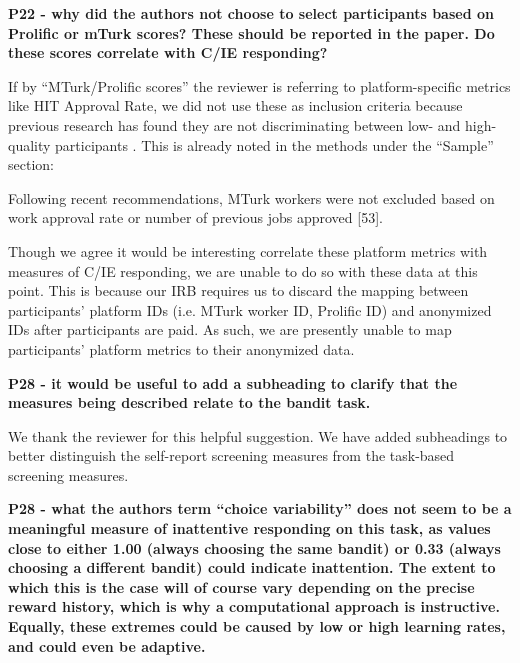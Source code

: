 \documentclass[a4paper,notitlepage,12pt]{article}
\begin{document}
\textbf{P22 - why did the authors not choose to select participants based on Prolific or mTurk scores? These should be reported in the paper. Do these scores correlate with C/IE responding?}

If by ``MTurk/Prolific scores'' the reviewer is referring to platform-specific metrics like HIT Approval Rate, we did not use these as inclusion criteria because previous research has found they are not discriminating between low- and high-quality participants \cite{robinson2019tapped}. This is already noted in the methods under the ``Sample'' section:

\begin{displayquote}
Following recent recommendations, MTurk workers were not excluded based on work approval rate or number of previous jobs approved [53].
\end{displayquote}

Though we agree it would be interesting correlate these platform metrics with measures of C/IE responding, we are unable to do so with these data at this point. This is because our IRB requires us to discard the mapping between participants' platform IDs (i.e. MTurk worker ID, Prolific ID) and anonymized IDs after participants are paid. As such, we are presently unable to map participants' platform metrics to their anonymized data.

\textbf{P28 - it would be useful to add a subheading to clarify that the measures being described relate to the bandit task.}

We thank the reviewer for this helpful suggestion. We have added subheadings to better distinguish the self-report screening measures from the task-based screening measures. 

\textbf{P28 - what the authors term ``choice variability'' does not seem to be a meaningful measure of inattentive responding on this task, as values close to either 1.00 (always choosing the same bandit) or 0.33 (always choosing a different bandit) could indicate inattention. The extent to which this is the case will of course vary depending on the precise reward history, which is why a computational approach is instructive. Equally, these extremes could be caused by low or high learning rates, and could even be adaptive.}
\end{document}
